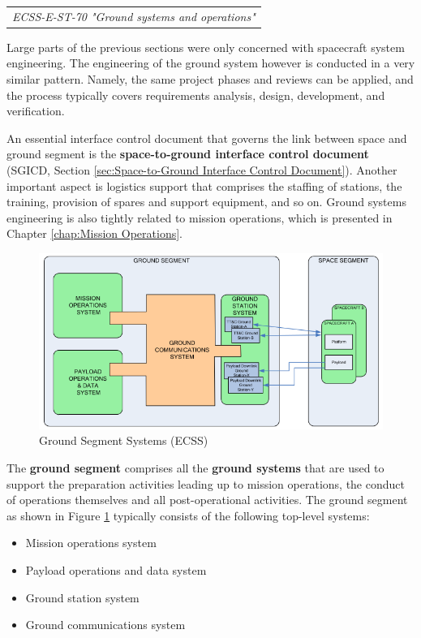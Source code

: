 \begin{tabular}{l}
\textit{ECSS-E-ST-70 "Ground systems and operations" \cite{ECSS-E-ST-70}}
\end{tabular}

Large parts of the previous sections were only concerned with spacecraft system engineering. The engineering of the ground system however is conducted in a very similar pattern. Namely, the same project phases and reviews can be applied, and the process typically covers requirements analysis, design, development, and verification. 

An essential interface control document that governs the link between space and ground segment is the \textbf{space-to-ground interface control document} (SGICD, Section \ref{sec:Space-to-Ground Interface Control Document}). Another important aspect is logistics support that comprises the staffing of stations, the training, provision of spares and support equipment, and so on. Ground systems engineering is also tightly related to mission operations, which is presented in Chapter \ref{chap:Mission Operations}.

\begin{figure}[h]
\centering\includegraphics[scale=0.5]{fig/ground_segment_systems}
\caption{Ground Segment Systems (ECSS)}
\label{fig:Ground Segment Systems}
\end{figure}

The \textbf{ground segment} comprises all the \textbf{ground systems} that are used to support the preparation activities leading up to mission operations, the conduct of operations themselves and all post-operational activities. The ground segment as shown in Figure \ref{fig:Ground Segment Systems} typically consists of the following top-level systems:

\begin{itemize}
\item Mission operations system
\item Payload operations and data system
\item Ground station system
\item Ground communications system
\end{itemize}

